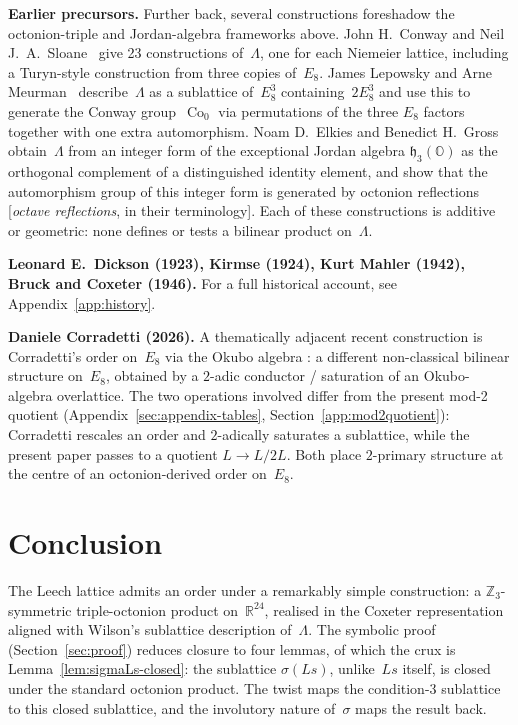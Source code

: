 \documentclass[twoside,english]{paper}
\numberwithin{equation}{section}
\numberwithin{figure}{section}
\theoremstyle{definition}
\theoremstyle{remark}
\newcommand{\OO}{\mathbb{O}}          %
\newcommand{\RR}{\mathbb{R}}
\newcommand{\ZZ}{\mathbb{Z}}
\newcommand{\LL}{\Lambda}             %
\DeclareMathOperator{\Co}{Co}
\begin{document}
\textbf{Earlier precursors.}  Further back, several constructions
foreshadow the octonion-triple and Jordan-algebra frameworks above.
John H.~Conway and Neil J.~A.~Sloane~\cite{ConwaySloane1982} give 23
constructions of~$\LL$, one for each Niemeier lattice, including a
Turyn-style construction from three copies of~$E_8$.  James Lepowsky
and Arne Meurman~\cite{LepowskyMeurman1982} describe~$\LL$ as a
sublattice of~$E_8^3$ containing~$2 E_8^3$ and use this to generate
the Conway group~$\Co_0$ via permutations of the three $E_8$ factors
together with one extra automorphism.  Noam D.~Elkies and
Benedict H.~Gross~\cite{ElkiesGross1996}
obtain~$\LL$ from an integer form of the exceptional Jordan algebra
$\mathfrak{h}_3(\OO)$ as the orthogonal complement of a distinguished
identity element, and show that the automorphism group of this
integer form is generated by octonion reflections [\emph{octave
reflections}, in their terminology].  Each of these
constructions is additive or geometric: none defines or tests a
bilinear product on~$\LL$.

\textbf{Leonard E.~Dickson (1923), Kirmse (1924), Kurt Mahler (1942),
Bruck and Coxeter (1946).}  For a full historical account, see
Appendix~\ref{app:history}.

\textbf{Daniele Corradetti (2026).}  A thematically adjacent recent
construction is Corradetti's order on~$E_8$ via the Okubo algebra
\cite{Corradetti2026}: a different non-classical bilinear structure
on~$E_8$, obtained by a $2$-adic conductor / saturation of an
Okubo-algebra overlattice.  The two operations involved differ from
the present mod-2 quotient (Appendix~\ref{sec:appendix-tables},
Section~\ref{app:mod2quotient}): Corradetti rescales an order and
$2$-adically saturates a sublattice, while the present paper passes
to a quotient $L \to L/2L$.  Both place $2$-primary structure at
the centre of an octonion-derived order on~$E_8$.

\section{Conclusion}\label{sec:conclusion}

The Leech lattice admits an order under a remarkably simple
construction: a $\ZZ_3$-symmetric triple-octonion product on~$\RR^{24}$,
realised in the Coxeter representation aligned with Wilson's
sublattice description of~$\LL$.  The symbolic proof
(Section~\ref{sec:proof}) reduces closure to four lemmas, of which
the crux is Lemma~\ref{lem:sigmaLs-closed}: the sublattice
$\sigma(Ls)$, unlike~$Ls$ itself, is closed under the standard
octonion product.  The twist
maps the condition-3 sublattice to this closed sublattice, and the
involutory nature of~$\sigma$ maps the result back.
\end{document}
